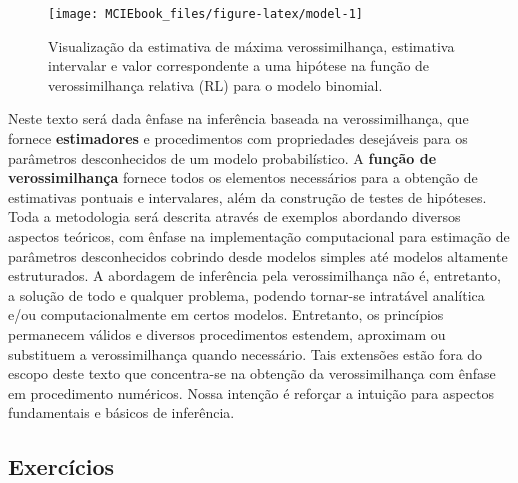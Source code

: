 \documentclass[
  9pt,
  a5paper,
]{book}
\theoremstyle{definition}
\theoremstyle{definition}
\theoremstyle{definition}
\theoremstyle{definition}
\theoremstyle{remark}
\begin{document}
\begin{figure}[h]

{\centering \texttt{[image: MCIEbook\_files/figure-latex/model-1]} 

}

\caption{Visualização da estimativa de máxima verossimilhança, estimativa intervalar e valor correspondente a uma hipótese na função de verossimilhança relativa (RL) para o modelo binomial.}\label{fig:model}
\end{figure}

Neste texto será dada ênfase na inferência baseada na verossimilhança, que fornece \textbf{estimadores} e procedimentos com propriedades desejáveis para os parâmetros desconhecidos de um modelo probabilístico. A \textbf{função de verossimilhança} fornece todos os elementos necessários
para a obtenção de estimativas pontuais e intervalares, além da construção de testes de hipóteses. Toda a metodologia será descrita através de exemplos abordando diversos aspectos teóricos, com ênfase na implementação computacional para estimação de parâmetros desconhecidos cobrindo desde modelos simples até modelos altamente estruturados.
A abordagem de inferência pela verossimilhança não é, entretanto, a solução de todo e qualquer problema, podendo tornar-se intratável analítica e/ou computacionalmente em certos modelos. Entretanto, os princípios permanecem válidos e diversos procedimentos estendem, aproximam ou substituem a verossimilhança quando necessário. Tais extensões estão fora do escopo deste texto que concentra-se na obtenção da verossimilhança com ênfase em procedimento numéricos. Nossa intenção é reforçar a intuição para aspectos fundamentais e básicos de inferência.

\hypertarget{exercuxedcios}{%
\subsection*{Exercícios}\label{exercuxedcios}}
\end{document}
